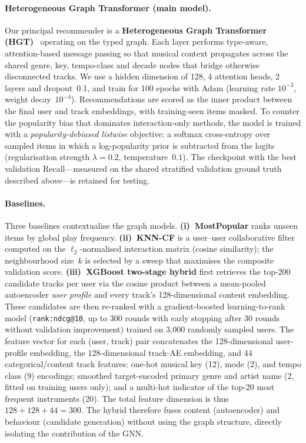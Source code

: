 \paragraph{Heterogeneous Graph Transformer (main model).}
Our principal recommender is a \textbf{Heterogeneous Graph Transformer
(HGT)}~\cite{Alpher04} operating on the typed graph.  Each layer performs type-aware, attention-based message
passing so that musical context propagates across the shared genre, key,
tempo-class and decade nodes that bridge otherwise disconnected tracks. We use
a hidden dimension of 128, 4 attention heads, 2 layers and dropout~0.1, and
train for 100 epochs with Adam (learning rate $10^{-3}$, weight
decay~$10^{-4}$). Recommendations are scored as the inner product between the
final user and track embeddings, with training-seen items masked. To counter
the popularity bias that dominates interaction-only methods, the model is
trained with a \emph{popularity-debiased listwise} objective: a softmax
cross-entropy over sampled items in which a log-popularity prior is subtracted
from the logits (regularisation strength $\lambda=0.2$, temperature~$0.1$).
The checkpoint with the best validation Recall---measured on the shared
stratified validation ground truth described above---is retained for testing.

\paragraph{Baselines.}
Three baselines contextualise the graph models.
\textbf{(i)~MostPopular} ranks unseen items by global play frequency.
\textbf{(ii)~KNN-CF} is a user--user collaborative filter computed on the
$\ell_2$-normalised interaction matrix (cosine similarity); the neighbourhood
size~$k$ is selected by a sweep that maximises the composite validation score.
\textbf{(iii)~XGBoost two-stage hybrid} first retrieves the top-200 candidate
tracks per user via the cosine product between a mean-pooled autoencoder
\emph{user profile} and every track's 128-dimensional content embedding. These
candidates are then re-ranked with a gradient-boosted learning-to-rank model
(\texttt{rank:ndcg@10}, up to 300 rounds with early stopping after 30 rounds
without validation improvement) trained on 3{,}000 randomly sampled users. The
feature vector for each (user, track) pair concatenates the
128-dimensional user-profile embedding, the 128-dimensional track-AE embedding,
and 44 categorical/content track features: one-hot musical key (12), mode (2),
and tempo class (9) encodings; smoothed target-encoded primary genre and artist
name (2, fitted on training users only); and a multi-hot indicator of the
top-20 most frequent instruments (20). The total feature dimension is thus
$128+128+44=300$. The hybrid therefore fuses content (autoencoder) and
behaviour (candidate generation) without using the graph structure, directly
isolating the contribution of the GNN.

